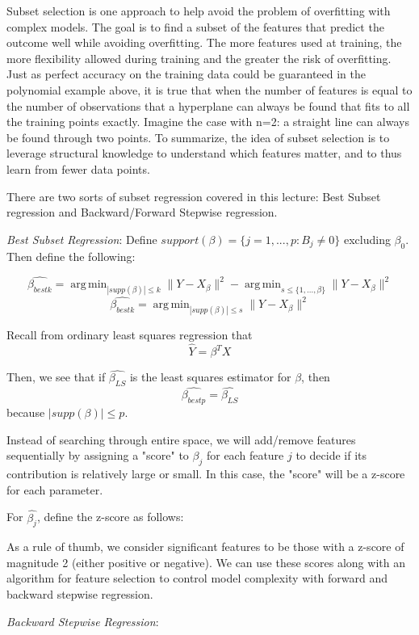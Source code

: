 \documentclass[a4paper]{article}
\begin{document}
Subset selection is one approach to help avoid the problem of overfitting with complex models.  The goal is to find a subset of the features that predict the outcome well while avoiding overfitting.  The more features used at training, the more flexibility allowed during training and the greater the risk of overfitting.  Just as perfect accuracy on the training data could be guaranteed in the polynomial example above, it is true that when the number of features is equal to the number of observations that a hyperplane can always be found that fits to all the training points exactly.  Imagine the case with n=2: a straight line can always be found through two points.  To summarize, the idea of subset selection is to leverage structural knowledge to understand which features matter, and to thus learn from fewer data points.

There are two sorts of subset regression covered in this lecture: Best Subset regression and Backward/Forward Stepwise regression.

\emph{Best Subset Regression}: 
Define $support(\beta) = \{j=1,...,p:B_j\neq0\}$ excluding $\beta_0$. Then define the following:

$$\hat{\beta_{bestk}} = \operatorname{arg\,min}_{|supp(\beta)|\leq k} \| Y - X_{\beta} \|^2 - 
\operatorname{arg\,min}_{s \leq \{1,...,\beta\} } \| Y - X_{\beta} \|^2$$
$$\hat{\beta_{bestk}} = \operatorname{arg\,min}_{|supp(\beta)|\leq s} \| Y - X_{\beta} \|^2$$

Recall from ordinary least squares regression that
$$\hat{Y} = \beta^{T}X$$

Then, we see that if $\hat{\beta_{LS}}$ is the least squares estimator for $\beta$, then
$$\hat{\beta_{bestp}} =\hat{\beta_{LS}}$$
 because $|supp(\beta)| \leq p$.
 
 Instead of searching through entire space, we will add/remove features sequentially by assigning a "score" to $\beta_{j}$ for each feature $j$ to decide if its contribution is relatively large or small. In this case, the "score" will be a z-score for each parameter.
 
 For $\hat{\beta_j}$, define the z-score as follows:
 
 
 As a rule of thumb, we consider significant features to be those with a z-score of magnitude 2 (either positive or negative). We can use these scores along with an algorithm for feature selection to control model complexity with forward and backward stepwise regression.
 
 \emph{Backward Stepwise Regression}:
 
\end{document}
